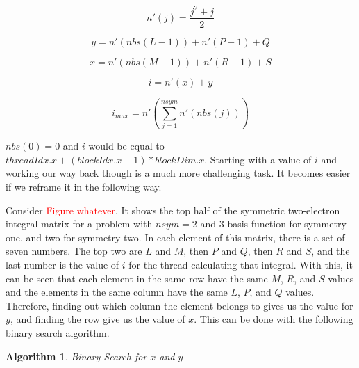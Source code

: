 \documentclass[12pt]{report}
\newcommand{\notetodylan}[1]{\textcolor{red}{#1}} %
\newtheorem{algorithm}[theorem]{Algorithm}
\begin{document}
\begin{equation}
\label{nprime}
n'(j) = \frac{j^{2}+j}{2}
\end{equation}

\begin{equation}
\label{ylpq}
y = n'(nbs(L - 1)) + n'(P - 1) + Q
\end{equation}

\begin{equation}
\label{xmrs}
x = n'(nbs(M - 1)) + n'(R - 1) + S
\end{equation}

\begin{equation}
\label{numtothread}
i = n'(x) + y
\end{equation}

\begin{equation}
\label{imax}
i_{max} = n'(\sum^{nsym}_{j = 1}n'(nbs(j)))
\end{equation}

$nbs(0) = 0$ and $i$ would be equal to $threadIdx.x + (blockIdx.x - 1) * blockDim.x$. Starting with a value of $i$ and working our way back though is a much more challenging task. It becomes easier if we reframe it in the following way.

Consider \notetodylan{Figure whatever}. It shows the top half of the symmetric two-electron integral matrix for a problem with $nsym = 2$ and 3 basis function for symmetry one, and two for symmetry two. In each element of this matrix, there is a set of seven numbers. The top two are $L$ and $M$, then $P$ and $Q$, then $R$ and $S$, and the last number is the value of $i$ for the thread calculating that integral. With this, it can be seen that each element in the same row have the same $M$, $R$, and $S$ values and the elements in the same column have the same $L$, $P$, and $Q$ values. Therefore, finding out which column the element belongs to gives us the value for $y$, and finding the row give us the value of $x$. This can be done with the following binary search algorithm. 

\begin{algorithm}
\caption{Binary Search for $x$ and $y$}
\label{bsxy}
\begin{algorithmic}

\ENDIF


		\ENDIF
	\ENDWHILE
\ENDIF

\end{algorithmic}
\end{algorithm}
\end{document}
